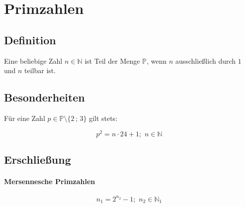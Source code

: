 \documentclass{article}
\begin{document}
\section{Primzahlen}
\subsection{Definition}
Eine beliebige Zahl $n \in \mathbb{N}$ ist Teil der Menge $\mathbb{P}$, wenn $n$ ausschließlich durch $1$ und $n$ teilbar ist.

\subsection{Besonderheiten}
Für eine Zahl $p \in \mathbb{P} \setminus \{2\,;\,3\}$ gilt stets:

\[p^2 = n \cdot 24 + 1;\,\,n \in \mathbb{N}\]

\subsection{Erschließung}
\paragraph{Mersennesche Primzahlen}
\[n_1 = 2^{n_2} - 1;\,\,n_2 \in \mathbb{N}_1\]
\end{document}
